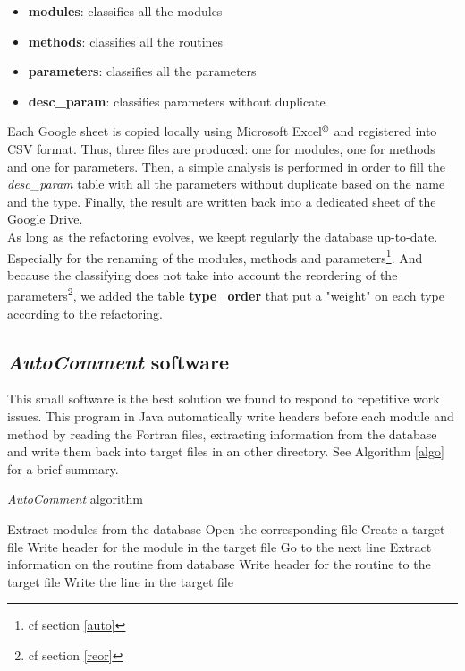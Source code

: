\begin{itemize}
\item \textbf{modules}: classifies all the modules
\item \textbf{methods}: classifies all the routines
\item \textbf{parameters}: classifies all the parameters
\item \textbf{desc\_param}: classifies parameters without duplicate
\end{itemize}
Each Google sheet is copied locally using Microsoft Excel$^\copyright$ and registered into CSV format. Thus, three files are produced: one for modules, one for methods and one for parameters. Then, a simple analysis is performed in order to fill the \textit{desc\_param} table with all the parameters without duplicate based on the name and the type. Finally, the result are written back into a dedicated sheet of the Google Drive.\\

As long as the refactoring evolves, we keept regularly the database up-to-date. Especially for the renaming of the modules, methods and parameters\footnote{cf section \ref{auto}}. And because the classifying does not take into account the reordering of the parameters\footnote{cf section \ref{reor}}, we added the table \textbf{type\_order} that put a "weight" on each type according to the refactoring.

\subsection{\textit{AutoComment} software\label{auto}}
This small software is the best solution we found to respond to repetitive work issues. This program in Java automatically write headers before each module and method by reading the Fortran files, extracting information from the database and write them back into target files in an other directory. See Algorithm \ref{algo} for a brief summary. 
\begin{algorithm}
\caption{\textit{AutoComment} algorithm}
\label{algo}
\begin{algorithmic}
\State Extract modules from the database
\State Open the corresponding file
\State Create a target file
\State Write header for the module in the target file
			\State Go to the next line
			\State Extract information on the routine from database
			\State Write header for the routine to the target file
		\Else
			\State Write the line in the target file
		\EndIf
	\EndFor
\EndFor
\end{algorithmic}
\end{algorithm}

